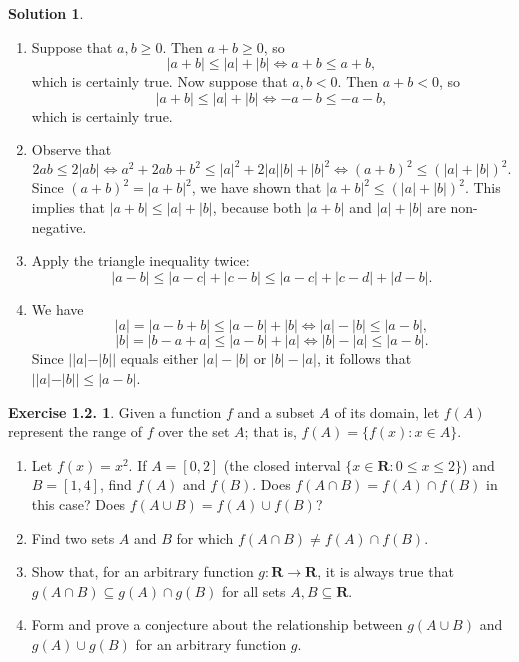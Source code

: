 \documentclass[12pt]{article}
\theoremstyle{definition}
\theoremstyle{exercise}
\newtheorem{exercise}{Exercise 1.2.}
\theoremstyle{solution}
\newtheorem*{solution}{Solution}
\begin{document}
\begin{solution}
    \begin{enumerate}[label = (\alph*)]
        \item Suppose that \( a, b \geq 0 \). Then \( a + b \geq 0 \), so
        \[
            |a + b| \leq |a| + |b| \iff a + b \leq a + b,
        \]
        which is certainly true. Now suppose that \( a, b < 0 \). Then \( a + b < 0 \), so
        \[
            |a + b| \leq |a| + |b| \iff -a - b \leq -a - b,
        \]
        which is certainly true.

        \item Observe that
        \[
            2ab \leq 2|ab| \iff a^2 + 2ab + b^2 \leq |a|^2 + 2|a||b| + |b|^2 \iff (a + b)^2 \leq (|a| + |b|)^2.
        \]
        Since \( (a + b)^2 = |a + b|^2 \), we have shown that \( |a + b|^2 \leq (|a| + |b|)^2 \). This implies that \( |a + b| \leq |a| + |b| \), because both \( |a + b| \) and \( |a| + |b| \) are non-negative.

        \item Apply the triangle inequality twice:
        \[
            |a - b| \leq |a - c| + |c - b| \leq |a - c| + |c - d| + |d - b|.
        \]

        \item We have
        \[
            |a| = |a - b + b| \leq |a - b| + |b| \iff |a| - |b| \leq |a - b|,
        \]
        \[
            |b| = |b - a + a| \leq |a - b| + |a| \iff |b| - |a| \leq |a - b|.
        \]
        Since \( ||a| - |b|| \) equals either \( |a| - |b| \) or \( |b| - |a| \), it follows that \( ||a| - |b|| \leq |a - b| \).
    \end{enumerate}
\end{solution}

\begin{exercise}
\label{ex:7}
    Given a function \( f \) and a subset \( A \) of its domain, let \( f(A) \) represent the range of \( f \) over the set \( A \); that is, \( f(A) = \{ f(x) : x \in A \} \).
    \begin{enumerate}[label = (\alph*)]
        \item Let \( f(x) = x^2 \). If \( A = [0, 2] \) (the closed interval \( \{ x \in \mathbf{R} : 0 \leq x \leq 2 \} \)) and \( B = [1, 4] \), find \( f(A) \) and \( f(B) \). Does \( f(A \cap B) = f(A) \cap f(B) \) in this case? Does \( f(A \cup B) = f(A) \cup f(B) \)?

        \item Find two sets \( A \) and \( B \) for which \( f(A \cap B) \neq f(A) \cap f(B) \).

        \item Show that, for an arbitrary function \( g : \mathbf{R} \to \mathbf{R} \), it is always true that \( g(A \cap B) \subseteq g(A) \cap g(B) \) for all sets \( A, B \subseteq \mathbf{R} \).

        \item Form and prove a conjecture about the relationship between \( g(A \cup B) \) and \( g(A) \cup g(B) \) for an arbitrary function \( g \).
    \end{enumerate}
\end{exercise}
\end{document}

